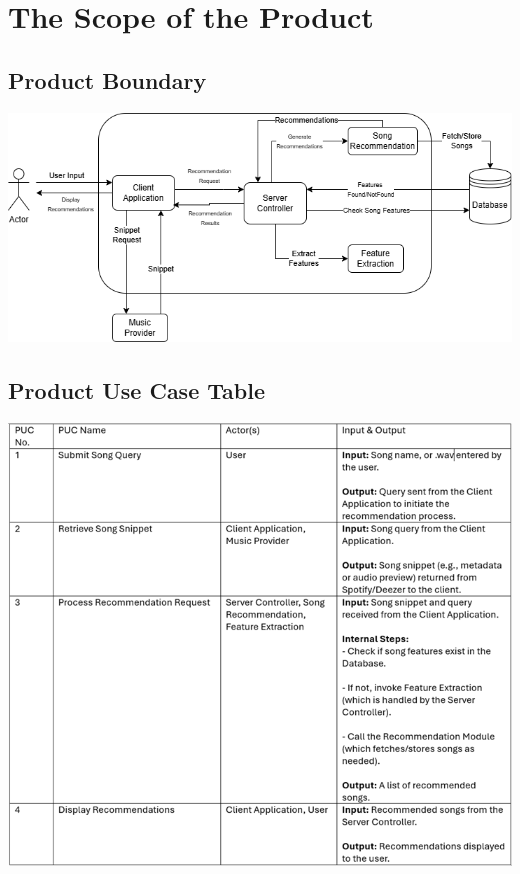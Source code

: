\documentclass[12pt]{article}
\begin{document}
\section{The Scope of the Product}
\subsection{Product Boundary}
\includegraphics[width=\textwidth]{p_scope.png} \\
\subsection{Product Use Case Table}
\includegraphics[width=\textwidth]{PUCTable.png} \\
\end{document}
